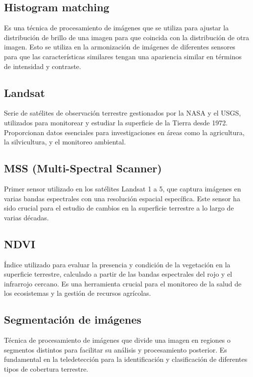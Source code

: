             \subsection{Histogram matching}
                Es una técnica de procesamiento de imágenes que se utiliza para ajustar la distribución de brillo de una imagen para que coincida con la distribución de otra imagen. Esto se utiliza en la armonización de imágenes de diferentes sensores para que las características similares tengan una apariencia similar en términos de intensidad y contraste.
            
            \subsection{Landsat}
                Serie de satélites de observación terrestre gestionados por la NASA y el USGS, utilizados para monitorear y estudiar la superficie de la Tierra desde 1972. Proporcionan datos esenciales para investigaciones en áreas como la agricultura, la silvicultura, y el monitoreo ambiental.
                
            \subsection{MSS (Multi-Spectral Scanner)}
                Primer sensor utilizado en los satélites Landsat 1 a 5, que captura imágenes en varias bandas espectrales con una resolución espacial específica. Este sensor ha sido crucial para el estudio de cambios en la superficie terrestre a lo largo de varias décadas.
                
            \subsection{NDVI}
                Índice utilizado para evaluar la presencia y condición de la vegetación en la superficie terrestre, calculado a partir de las bandas espectrales del rojo y el infrarrojo cercano. Es una herramienta crucial para el monitoreo de la salud de los ecosistemas y la gestión de recursos agrícolas.
            
            \subsection{Segmentación de imágenes}
                Técnica de procesamiento de imágenes que divide una imagen en regiones o segmentos distintos para facilitar su análisis y procesamiento posterior. Es fundamental en la teledetección para la identificación y clasificación de diferentes tipos de cobertura terrestre.
            
